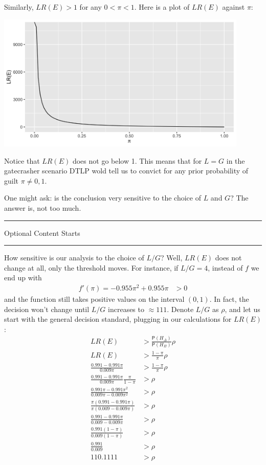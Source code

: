 \documentclass[
  10pt,
  dvipsnames,enabledeprecatedfontcommands]{scrartcl}
\newcommand{\pr}[1]{\mathsf{P}(#1)}
\newcommand{\intermezzoa}{
	\begin{minipage}[c]{13cm}
	\begin{center}\rule{10cm}{0.4pt}



	\tiny{\sc Optional Content Starts}
	
	\vspace{-1mm}
	
	\rule{10cm}{0.4pt}\end{center}
	\end{minipage}\nopagebreak 
	}
\begin{document}
Similarly, \(LR(E)>1\) for any \(0< \pi <1\). Here is a plot of
\(LR(E)\) against \(\pi\):

\includegraphics[width=12cm]{lre-gate.png}

\noindent Notice that \(LR(E)\) does not go below 1. This means that for
\(L=G\) in the gatecrasher scenario DTLP wold tell us to convict for any
prior probability of guilt \(\pi\neq 0,1\).

One might ask: is the conclusion very sensitive to the choice of \(L\)
and \(G\)? The answer is, not too much.

\intermezzoa

How sensitive is our analysis to the choice of \(L/G\)? Well, \(LR(E)\)
does not change at all, only the threshold moves. For instance, if
\(L/G=4\), instead of \(f\) we end up with \begin{align*}
 f'(\pi) = - 0.955 \pi^2 + 0.955\pi &>0 
 \end{align*} and the function still takes positive values on the
interval \((0,1)\). In fact, the decision won't change until \(L/G\)
increases to \(\approx 111\). Denote \(L/G\) as \(\rho\), and let us
start with the general decision standard, plugging in our calculations
for \(LR(E)\): \begin{align*}
LR(E) &> \frac{\pr{H_\Delta}}{\pr{H_\Pi}} \rho\\
LR(E) &> \frac{1-\pi}{\pi} \rho \\
\frac{0.991-0.991\pi}{0.009\pi} &> \frac{1-\pi}{\pi} \rho\\
\frac{0.991-0.991\pi}{0.009\pi}\frac{\pi}{1-\pi} &>  \rho\\
\frac{0.991\pi-0.991\pi^2}{0.009\pi-0.009\pi^2} &>  \rho\\
\frac{\pi(0.991-0.991\pi)}{\pi(0.009-0.009\pi)} &>  \rho\\
\frac{0.991-0.991\pi}{0.009-0.009\pi} &>  \rho\\
\frac{0.991(1-\pi)}{0.009(1-\pi)} &>  \rho\\
\frac{0.991}{0.009} &>  \rho\\
110.1111 &>  \rho\\
\end{align*}
\end{document}
